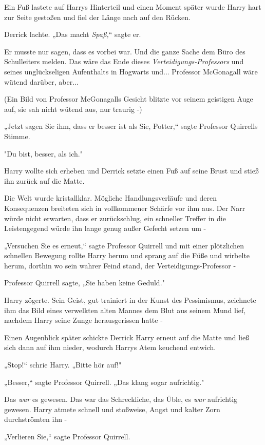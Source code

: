 {Ein Fuß lastete auf Harrys Hinterteil und einen Moment später wurde Harry hart zur Seite gestoßen und fiel der Länge nach auf den Rücken.

Derrick lachte. „Das macht \emph{Spaß,}“ sagte er.

Er musste nur sagen, dass es vorbei war. Und die ganze Sache dem Büro des Schulleiters melden. Das wäre das Ende dieses \emph{Verteidigungs-Professors} und seines unglückseligen Aufenthalts in Hogwarts und... Professor McGonagall wäre wütend darüber, aber...

(Ein Bild von Professor McGonagalls Gesicht blitzte vor seinem geistigen Auge auf, sie sah nicht wütend aus, nur traurig -)

„Jetzt sagen Sie ihm, dass er besser ist als Sie, Potter,“ sagte Professor Quirrells Stimme.

"Du bist, besser, als ich."

Harry wollte sich erheben und Derrick setzte einen Fuß auf seine Brust und stieß ihn zurück auf die Matte.

Die Welt wurde kristallklar. Mögliche Handlungsverläufe und deren Konsequenzen breiteten sich in vollkommener Schärfe vor ihm aus. Der Narr würde nicht erwarten, dass er zurückschlug, ein schneller Treffer in die Leistengegend würde ihn lange genug außer Gefecht setzen um -

„Versuchen Sie es erneut,“ sagte Professor Quirrell und mit einer plötzlichen schnellen Bewegung rollte Harry herum und sprang auf die Füße und wirbelte herum, dorthin wo sein wahrer Feind stand, der Verteidigungs-Professor -

Professor Quirrell sagte, „Sie haben keine Geduld."

Harry zögerte. Sein Geist, gut trainiert in der Kunst des Pessimismus, zeichnete ihm das Bild eines verwelkten alten Mannes dem Blut aus seinem Mund lief, nachdem Harry seine Zunge herausgerissen hatte -

Einen Augenblick später schickte Derrick Harry erneut auf die Matte und ließ sich dann auf ihm nieder, wodurch Harrys Atem keuchend entwich.

„Stop!“ schrie Harry. „Bitte hör auf!"

„Besser,“ sagte Professor Quirrell. „Das klang sogar aufrichtig."

Das \emph{war} es gewesen. Das war das Schreckliche, das Üble, es \emph{war} aufrichtig gewesen. Harry atmete schnell und stoßweise, Angst und kalter Zorn durchströmten ihn -

„Verlieren Sie,“ sagte Professor Quirrell.

}
